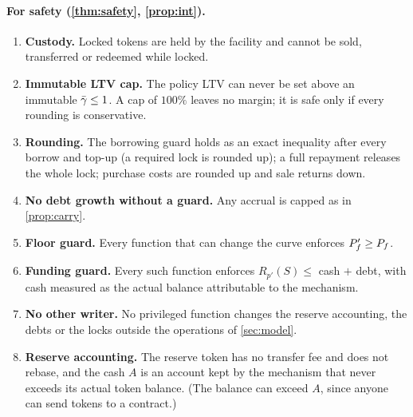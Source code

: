 \paragraph{For safety (\cref{thm:safety}, \cref{prop:int}).}
\begin{enumerate}[label=C\arabic*.,leftmargin=2.4em]
\item \textbf{Custody.} Locked tokens are held by the facility and cannot be sold, transferred or redeemed while locked.
\item \textbf{Immutable LTV cap.} The policy LTV can never be set above an immutable $\bar\gamma\le1$. A cap of $100\%$ leaves no margin; it is safe only if every rounding is conservative.
\item \textbf{Rounding.} The borrowing guard holds as an exact inequality after every borrow and top-up (a required lock is rounded up); a full repayment releases the whole lock; purchase costs are rounded up and sale returns down.
\item \textbf{No debt growth without a guard.} Any accrual is capped as in \cref{prop:carry}.
\item \textbf{Floor guard.} Every function that can change the curve enforces $P_f'\ge P_f$.
\item \textbf{Funding guard.} Every such function enforces $R_{p'}(S)\le$ cash $+$ debt, with cash measured as the actual balance attributable to the mechanism.
\item \textbf{No other writer.} No privileged function changes the reserve accounting, the debts or the locks outside the operations of \cref{sec:model}.
\item \textbf{Reserve accounting.} The reserve token has no transfer fee and does not rebase, and the cash $A$ is an account kept by the mechanism that never exceeds its actual token balance. (The balance can exceed $A$, since anyone can send tokens to a contract.)
\end{enumerate}

